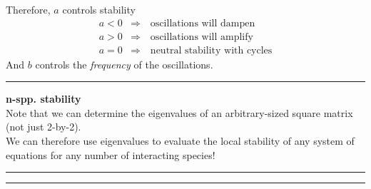 \documentclass{article}
\begin{document}
Therefore, $a$ controls stability
\begin{align*}
	a<0 &\Rightarrow \quad \text{oscillations will dampen}\\
	a>0 &\Rightarrow \quad \text{oscillations will amplify}\\
	a=0 &\Rightarrow \quad \text{neutral stability with cycles}
\end{align*}
And $b$ controls the \emph{frequency} of the oscillations.

 \rule[0.5ex]{\linewidth}{1pt}
\textbf{n-spp. stability}\\
 Note that we can determine the eigenvalues of an arbitrary-sized square matrix (not just 2-by-2).\\
 We can therefore use eigenvalues to evaluate the local stability of any system of equations for any number of interacting species!
 
\rule[0.5ex]{\linewidth}{1pt}
\rule[0.5ex]{\linewidth}{1pt}
\end{document}
